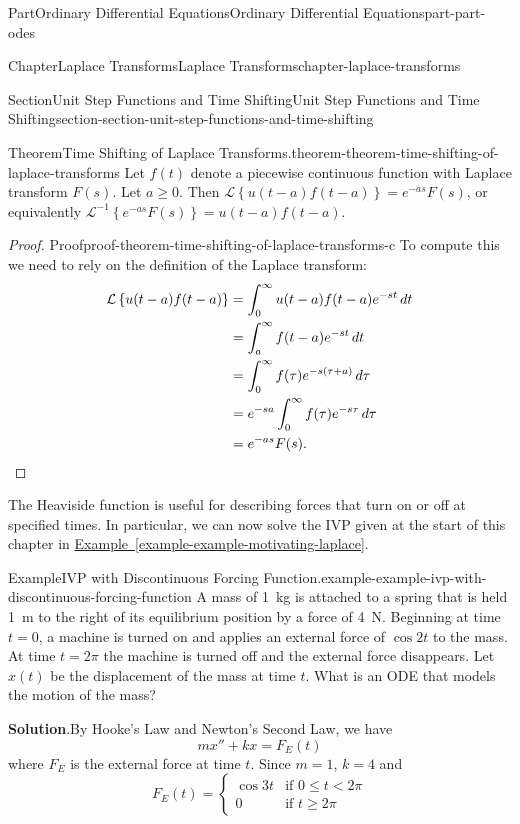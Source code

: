 \documentclass[twoside,10pt,]{book}
\newcommand{\blocktitlefont}{\relax}
\newcommand{\xreffont}{\relax}
\numberwithin{equation}{part}
\newcommand{\qedhere}{\relax}
\newcommand{\Laplace}[1]{\mathcal{L}\set{#1}}
\newcommand{\iLaplace}[1]{\mathcal{L}^{-1}\set{#1}}
\newcommand{\set}[1]{\left\{ #1 \right\}}
\newcommand{\lt}{<}
\newcommand{\amp}{&}
\begin{document}
\begin{partptx}{Part}{Ordinary Differential Equations}{}{Ordinary Differential Equations}{}{}{part-part-odes}
\begin{chapterptx}{Chapter}{Laplace Transforms}{}{Laplace Transforms}{}{}{chapter-laplace-transforms}
\begin{sectionptx}{Section}{Unit Step Functions and Time Shifting}{}{Unit Step Functions and Time Shifting}{}{}{section-section-unit-step-functions-and-time-shifting}
\begin{theorem}{Theorem}{Time Shifting of Laplace Transforms.}{}{theorem-theorem-time-shifting-of-laplace-transforms}
Let \(f(t)\) denote a piecewise continuous function with Laplace transform \(F(s)\). Let \(a\geq0\). Then \(\Laplace{u(t-a)f(t-a)} = e^{-as}F(s)\), or equivalently \(\iLaplace{e^{-as}F(s)} = u(t-a)f(t-a)\).%
\end{theorem}
\begin{proof}{Proof}{}{proof-theorem-time-shifting-of-laplace-transforms-c}
To compute this we need to rely on the definition of the Laplace transform:%
\begin{align*}
\Laplace{u(t-a)f(t-a)} &= \int_{0}^{\infty}u(t-a)f(t-a)e^{-st}\,dt\\
&= \int_{a}^{\infty}f(t-a)e^{-st}\,dt\\
&= \int_{0}^{\infty}f(\tau)e^{-s(\tau+a)}\,d\tau\\
&= e^{-sa}\int_{0}^{\infty}f(\tau)e^{-s\tau}\,d\tau\\
&= e^{-as}F(s)\text{.}\qedhere
\end{align*}
%
\end{proof}
The Heaviside function is useful for describing forces that turn on or off at specified times. In particular, we can now solve the IVP given at the start of this chapter in \hyperref[example-example-motivating-laplace]{Example~{\xreffont\ref{example-example-motivating-laplace}}}.%
\begin{example}{Example}{IVP with Discontinuous Forcing Function.}{example-example-ivp-with-discontinuous-forcing-function}%
A mass of \SI{1}{\kilogram} is attached to a spring that is held \SI{1}{\meter} to the right of its equilibrium position by a force of \SI{4}{\newton}. Beginning at time \(t=0\), a machine is turned on and applies an external force of \(\cos2t\) to the mass. At time \(t=2\pi\) the machine is turned off and the external force disappears. Let \(x(t)\) be the displacement of the mass at time \(t\). What is an ODE that models the motion of the mass?%
\par\smallskip%
\noindent\textbf{\blocktitlefont Solution}.\hypertarget{solution-example-ivp-with-discontinuous-forcing-function-c}{}\quad{}By Hooke's Law and Newton's Second Law, we have%
\begin{equation*}
mx''+kx = F_{E}(t)
\end{equation*}
where \(F_{E}\) is the external force at time \(t\). Since \(m = 1\), \(k = 4\) and%
\begin{equation*}
F_{E}(t) = 
\begin{cases}
\cos3t \amp\text{if }0\leq t\lt 2\pi\\
0 \amp\text{if }t\geq2\pi  
\end{cases}

\end{equation*}
\end{example}
\end{sectionptx}
\end{chapterptx}
\end{partptx}
\end{document}
